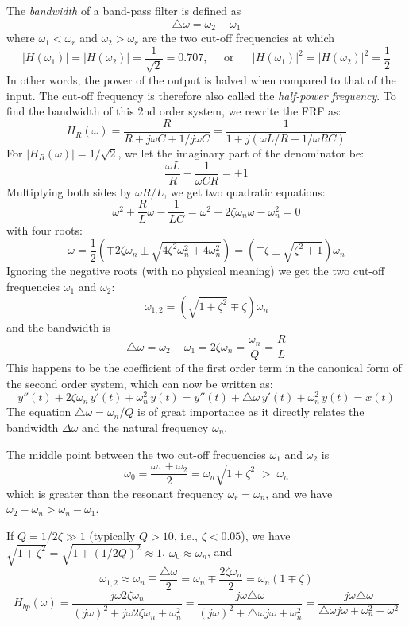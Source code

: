 \begin{itemize}
  The {\em bandwidth} of a band-pass filter is defined as 
  \[ 
  \triangle \omega=\omega_2-\omega_1 
  \]
  where $\omega_1<\omega_r$ and $\omega_2>\omega_r$ are the two cut-off 
  frequencies at which
  \[ 
  |H(\omega_1)|=|H(\omega_2)|=\frac{1}{\sqrt{2}}=0.707,\;\;\;\;\;\mbox{or}
  \;\;\;\;\;\;|H(\omega_1)|^2=|H(\omega_2)|^2=\frac{1}{2}
  \]
  In other words, the power of the output is halved when compared to 
  that of the input. The cut-off frequency is therefore also called the 
  {\em half-power frequency}. To find the bandwidth of this 2nd order 
  system, we rewrite the FRF as:
  \[
  H_R(\omega)=\frac{R}{R+j\omega C+1/j\omega C}
  =\frac{1}{1+j(\omega L/R-1/\omega RC)}
  \]
  For $|H_R(\omega)|=1/\sqrt{2}$, we let the imaginary part of the 
  denominator be:
  \[
  \frac{\omega L}{R}-\frac{1}{\omega CR}=\pm 1
  \]
  Multiplying both sides by $\omega R/L$, we get two quadratic
  equations:
  \[
  \omega^2\pm \frac{R}{L}\omega-\frac{1}{LC}=\omega^2\pm 2\zeta\omega_n\omega-\omega_n^2=0
  \]
  with four roots:
  \[
  \omega=\frac{1}{2}\left(\mp 2\zeta\omega_n\pm\sqrt{4\zeta^2\omega_n^2+4\omega_n^2}\right)
  =\left(\mp\zeta\pm\sqrt{\zeta^2+1}\right)\omega_n
  \]
  Ignoring the negative roots (with no physical meaning) we get
  the two cut-off frequencies $\omega_1$ and $\omega_2$:
  \[
  \omega_{1,2}=\left(\sqrt{1+\zeta^2}\mp \zeta\right) \omega_n
  \]
  and the bandwidth is
  \[
  \triangle \omega=\omega_2-\omega_1=2\zeta \omega_n=\frac{\omega_n}{Q}
  =\frac{R}{L}
  \]
  This happens to be the coefficient of the first order term in the 
  canonical form of the second order system, which can now be written as:
  \[ 
  y''(t)+2\zeta\omega_n\,y'(t)+\omega_n^2\, y(t)
  =y''(t)+\triangle\omega\,y'(t)+\omega_n^2\, y(t)= x(t) 
  \]
  The equation $\triangle\omega=\omega_n/Q$ is of great importance as
  it directly relates the bandwidth $\Delta\omega$ and the natural 
  frequency $\omega_n$.

  The middle point between the two cut-off frequencies $\omega_1$ and 
  $\omega_2$ is 
  \[
  \omega_0=\frac{\omega_1+\omega_2}{2}
  =\omega_n \sqrt{1+\zeta^2}\;>\;\omega_n
  \] 
  which is greater than the resonant frequency $\omega_r=\omega_n$,
  and we have $\omega_2-\omega_n>\omega_n-\omega_1$.



  If $Q=1/2\zeta \gg 1$ (typically $Q>10$, i.e., $\zeta<0.05$),
  we have $\sqrt{1+\zeta^2} =\sqrt{1+(1/2Q)^2} \approx 1$, 
  $\omega_0\approx\omega_n$, and
  \[
  \omega_{1,2}\approx \omega_n\mp \frac{\triangle\omega}{2}
  =\omega_n\mp\frac{2\zeta\omega_n}{2}=\omega_n(1\mp\zeta)
  \]
  \[
  H_{bp}(\omega)=\frac{j\omega 2\zeta \omega_n}{(j\omega)^2
    +j\omega 2\zeta \omega_n+\omega_n^2}	
  =\frac{j\omega \triangle \omega}
  {(j\omega)^2+\triangle \omega j\omega+\omega_n^2}
  =\frac{j\omega \triangle \omega}
  {\triangle \omega j\omega+\omega_n^2-\omega^2}
  \]


\end{itemize}
